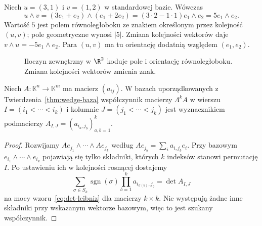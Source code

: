 \begin{przyklad}
Niech $u=(3,1)$ i $v=(1,2)$ w standardowej bazie.
Wówczas
\[
 u\wedge v=(3e_1+e_2)\wedge(e_1+2e_2)
 =(3\cdot2-1\cdot1)e_1\wedge e_2
 =5e_1\wedge e_2.
\]
Wartość $5$ jest polem równoległoboku ze znakiem określonym
przez kolejność $(u,v)$; pole geometryczne wynosi $|5|$.
Zmiana kolejności wektorów daje $v\wedge u=-5e_1\wedge e_2$.
Para $(u,v)$ ma tu orientację dodatnią względem $(e_1,e_2)$.
\end{przyklad}

\begin{figure}[H]
\centering
{}
\caption{Iloczyn zewnętrzny w $\R^2$ koduje pole i orientację
równoległoboku. Zmiana kolejności wektorów zmienia znak.}
\label{fig:wedge-pole}
\end{figure}

\begin{twierdzenie}
\label{thm:minory-lambda}
Niech $A\colon\mathbb K^n\to\mathbb K^m$ ma macierz
$(a_{ij})$. W bazach uporządkowanych z
Twierdzenia~\ref{thm:wedge-baza} współczynnik macierzy
$\Lambda^k A$ w wierszu $I=(i_1<\cdots<i_k)$ i kolumnie
$J=(j_1<\cdots<j_k)$ jest wyznacznikiem podmacierzy
$A_{I,J}=(a_{i_a,j_b})_{a,b=1}^k$.
\end{twierdzenie}
\begin{proof}
Rozwijamy
$Ae_{j_1}\wedge\cdots\wedge Ae_{j_k}$ według
$Ae_{j_b}=\sum_i a_{i,j_b}e_i$. Przy bazowym
$e_{i_1}\wedge\cdots\wedge e_{i_k}$ pojawiają się tylko
składniki, których $k$ indeksów stanowi permutację $I$.
Po ustawieniu ich w kolejności rosnącej dostajemy
\[
 \sum_{\sigma\in S_k}\operatorname{sgn}(\sigma)
 \prod_{b=1}^k a_{i_{\sigma(b)},j_b}
 =\det A_{I,J}
\]
na mocy wzoru~\eqref{eq:det-leibniz} dla macierzy $k\times k$.
Nie występują żadne inne składniki przy wskazanym
wektorze bazowym, więc to jest szukany współczynnik.
\end{proof}

